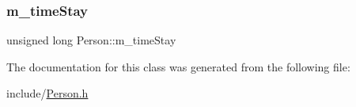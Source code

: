 \mbox{\label{class_person_a5554109f1f3a7c466f02346d0061c6e7}} 
\subsubsection{\texorpdfstring{m\_timeStay}{m\_timeStay}}
{\footnotesize\ttfamily unsigned long Person\+::m\+\_\+time\+Stay\hspace{0.3cm}{\ttfamily [private]}}



The documentation for this class was generated from the following file\+:\begin{DoxyCompactItemize}
\item 
include/\mbox{\hyperlink{_person_8h}{Person.\+h}}\end{DoxyCompactItemize}
